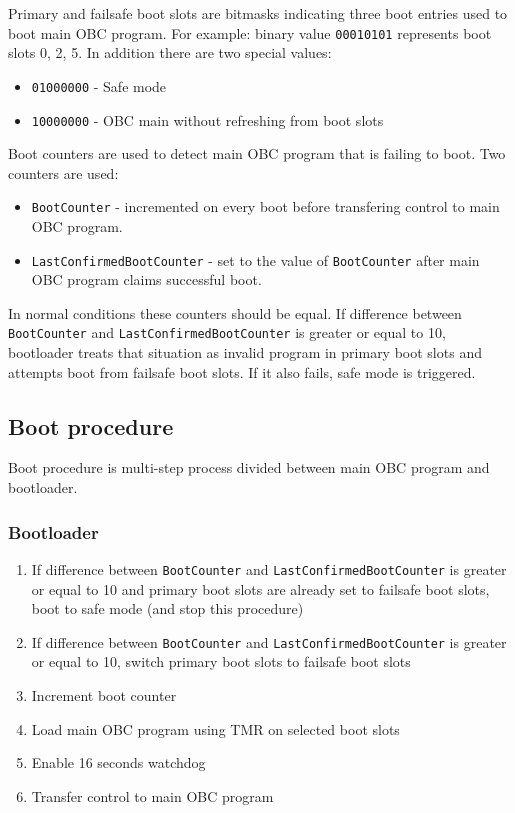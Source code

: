Primary and failsafe boot slots are bitmasks indicating three boot entries used to boot main OBC program. For example: binary value \texttt{00010101} represents boot slots 0, 2, 5. In addition there are two special values:
\begin{itemize}
	\item \texttt{01000000} - Safe mode
	\item \texttt{10000000} - OBC main without refreshing from boot slots
\end{itemize}

Boot counters are used to detect main OBC program that is failing to boot. Two counters are used: 
\begin{itemize}
	\item \texttt{BootCounter} - incremented on every boot before transfering control to main OBC program.
	\item \texttt{LastConfirmedBootCounter} - set to the value of \texttt{BootCounter} after main OBC program claims successful boot.
\end{itemize}

In normal conditions these counters should be equal. If difference between \texttt{BootCounter} and \texttt{LastConfirmedBootCounter} is greater or equal to 10, bootloader treats that situation as invalid program in primary boot slots and attempts boot from failsafe boot slots. If it also fails, safe mode is triggered.

\subsection{Boot procedure}
Boot procedure is multi-step process divided between main OBC program and bootloader.

\subsubsection{Bootloader}
\begin{enumerate}
	\item If difference between \texttt{BootCounter} and \texttt{LastConfirmedBootCounter} is greater or equal to 10 and primary boot slots are already set to failsafe boot slots, boot to safe mode (and stop this procedure)
	\item If difference between \texttt{BootCounter} and \texttt{LastConfirmedBootCounter} is greater or equal to 10, switch primary boot slots to failsafe boot slots
	\item Increment boot counter
	\item Load main OBC program using TMR on selected boot slots
	\item Enable 16 seconds watchdog
	\item Transfer control to main OBC program
\end{enumerate}

